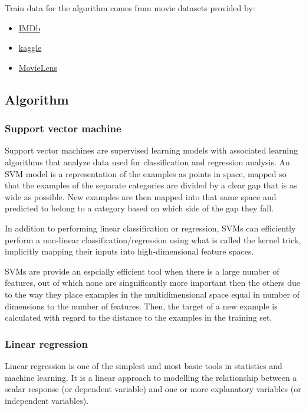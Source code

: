 \documentclass[a4paper,10pt]{article}
\begin{document}
Train data for the algorithm comes from movie datasets provided by:
\begin{itemize}
	\item \href{https://datasets.imdbws.com/}{IMDb}
	\item \href{https://www.kaggle.com/rounakbanik/the-movies-dataset}{kaggle}
	\item \href{https://grouplens.org/datasets/movielens/}{MovieLens}
\end{itemize}  
   
\subsection{Algorithm}
\subsubsection{Support vector machine}
Support vector machines are supervised learning models with associated learning algorithms that analyze data used for classification and regression analysis. An SVM model is a representation of the examples as points in space, mapped so that the examples of the separate categories are divided by a clear gap that is as wide as possible. New examples are then mapped into that same space and predicted to belong to a category based on which side of the gap they fall.

In addition to performing linear classification or regression, SVMs can efficiently perform a non-linear classification/regression using what is called the kernel trick, implicitly mapping their inputs into high-dimensional feature spaces.

SVMs are provide an espcially efficient tool when there is a large number of features, out of which none are singnificantly more important then the others due to the way they place examples in the multidimensional space equal in number of dimensions to the number of features. Then, the target of a new example is calculated with regard to the distance to the examples in the training set.
\subsubsection{Linear regression}
Linear regression is one of the simplest and most basic tools in statistics and machine learning. It is a linear approach to modelling the relationship between a scalar response (or dependent variable) and one or more explanatory variables (or independent variables).
\end{document}
